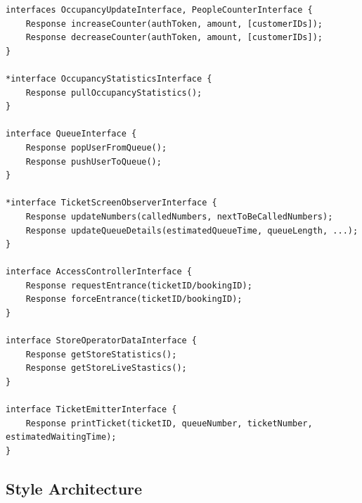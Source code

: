 \begin{lstlisting}
interfaces OccupancyUpdateInterface, PeopleCounterInterface {
    Response increaseCounter(authToken, amount, [customerIDs]);
    Response decreaseCounter(authToken, amount, [customerIDs]);
}

*interface OccupancyStatisticsInterface {
    Response pullOccupancyStatistics();
}

interface QueueInterface {
    Response popUserFromQueue();
    Response pushUserToQueue();
}

*interface TicketScreenObserverInterface {
    Response updateNumbers(calledNumbers, nextToBeCalledNumbers);
    Response updateQueueDetails(estimatedQueueTime, queueLength, ...);
}

interface AccessControllerInterface {
    Response requestEntrance(ticketID/bookingID);
    Response forceEntrance(ticketID/bookingID);
}

interface StoreOperatorDataInterface {
    Response getStoreStatistics();
    Response getStoreLiveStastics();
}

interface TicketEmitterInterface {
    Response printTicket(ticketID, queueNumber, ticketNumber, estimatedWaitingTime);
}

\end{lstlisting}


\subsection{Style Architecture}

